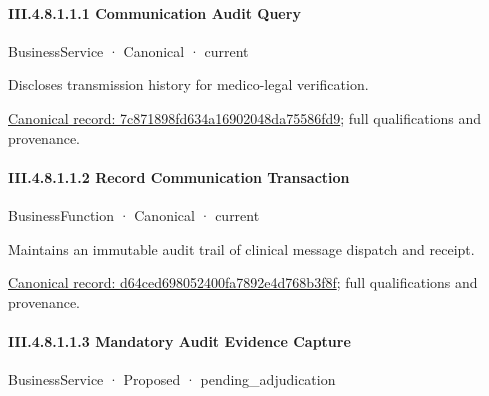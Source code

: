 \paragraph*{III.4.8.1.1.1 Communication Audit Query}
\label{navigation:III.4.8.1.1.1}

\label{element:7c871898fd634a16902048da75586fd9}
{\small BusinessService · Canonical · current}\par

Discloses transmission history for medico-legal verification.


{\footnotesize \href{../../../../../../../../continuum/business/business-service/7c871898fd634a16902048da75586fd9.md}{Canonical record: 7c871898fd634a16902048da75586fd9}; full qualifications and provenance.}\par
\paragraph*{III.4.8.1.1.2 Record Communication Transaction}
\label{navigation:III.4.8.1.1.2}

\label{element:d64ced698052400fa7892e4d768b3f8f}
{\small BusinessFunction · Canonical · current}\par

Maintains an immutable audit trail of clinical message dispatch and receipt.


{\footnotesize \href{../../../../../../../../continuum/business/business-function/d64ced698052400fa7892e4d768b3f8f.md}{Canonical record: d64ced698052400fa7892e4d768b3f8f}; full qualifications and provenance.}\par
\paragraph*{III.4.8.1.1.3 Mandatory Audit Evidence Capture}
\label{navigation:III.4.8.1.1.3}

\label{element:6ab3f8628ba14f17bddbf6092cf56ba7}
{\small BusinessService · Proposed · pending\_adjudication}\par

